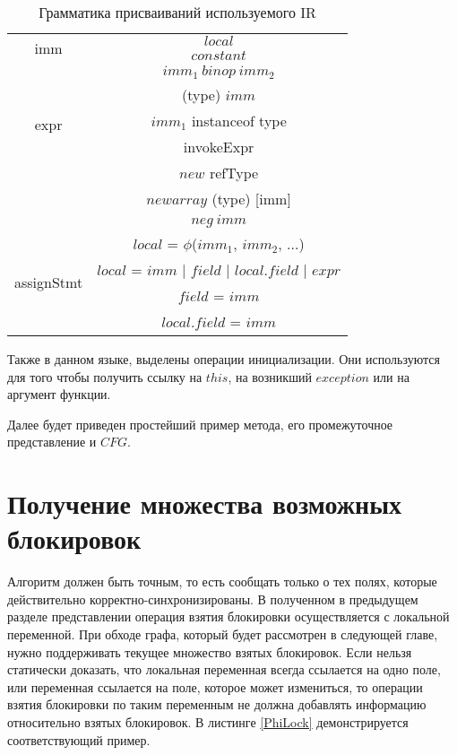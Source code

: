 \begin{table}[H]
\label{grammar}
\begin{center}
\begin{tabular}{|c|c|}
\hline

\multirow{2}{*}{imm}  & $local$ \\
		      & $constant$ \\
\hline
\multirow{5}{*}{expr} & $imm_1\ binop\ imm_2$ \\
		      & (type) $imm$ \\
		      & $imm_1$ instanceof type \\
      		      & invokeExpr \\
      		      & $new$ refType \\
      		      & $newarray$ (type) [imm] \\
		      & $neg\ imm$ \\
\hline
\multirow{4}{*}{assignStmt} & $local$ = $\phi$($imm_1$, $imm_2$, ...) \\ 
			    & $local$ = $imm$ | $field$ | $local.field$ | $expr$  \\ 
		            & $field$ = $imm$ \\
			    & $local.field$ = $imm$ \\
\hline
\end{tabular}
\captionsetup{justification=centering}
\caption{Грамматика присваиваний используемого IR}
\end{center}

\end{table}

Также в данном языке, выделены операции инициализации. Они используются для того чтобы получить ссылку на $this$, на возникший $exception$ или на аргумент функции. 


Далее будет приведен простейший пример метода, его промежуточное представление и $CFG$.

\renewcommand{\lstlistingname}{}

\renewcommand{\lstlistingname}{Листинг}




\FloatBarrier
\section{Получение множества возможных блокировок}
Алгоритм должен быть точным, то есть сообщать только о тех полях, которые действительно корректно-синхронизированы.
В полученном в предыдущем разделе представлении операция взятия блокировки осуществляется с локальной переменной. 
При обходе графа, который будет рассмотрен в следующей главе, нужно поддерживать текущее множество взятых блокировок.
Если нельзя статически доказать, что локальная переменная всегда ссылается на одно поле, или переменная ссылается на поле, которое может измениться, то операции взятия блокировки по таким переменным не должна добавлять информацию относительно взятых блокировок.
В листинге \ref{PhiLock} демонстрируется соответствующий пример.

